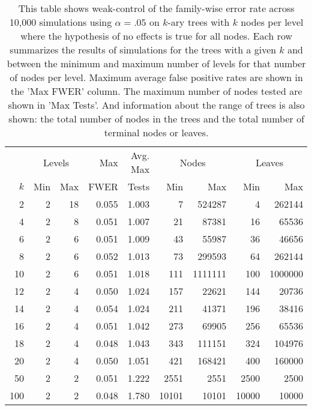 \begin{table}[ht]
\centering
\begin{tabular}{rrrrrrrrr}
  \toprule
  &\multicolumn{2}{c}{Levels} &Max&Avg. Max& \multicolumn{2}{c}{Nodes} & \multicolumn{2}{c}{Leaves}\\ $k$ & Min & Max & FWER & Tests & Min & Max & Min & Max \\ \midrule
   2 &    2 &   18 & 0.055 & 1.003 &    7 & 524287 &    4 & 262144 \\ 
     4 &    2 &    8 & 0.051 & 1.007 &   21 & 87381 &   16 & 65536 \\ 
     6 &    2 &    6 & 0.051 & 1.009 &   43 & 55987 &   36 & 46656 \\ 
     8 &    2 &    6 & 0.052 & 1.013 &   73 & 299593 &   64 & 262144 \\ 
    10 &    2 &    6 & 0.051 & 1.018 &  111 & 1111111 &  100 & 1000000 \\ 
    12 &    2 &    4 & 0.050 & 1.024 &  157 & 22621 &  144 & 20736 \\ 
    14 &    2 &    4 & 0.054 & 1.024 &  211 & 41371 &  196 & 38416 \\ 
    16 &    2 &    4 & 0.051 & 1.042 &  273 & 69905 &  256 & 65536 \\ 
    18 &    2 &    4 & 0.048 & 1.043 &  343 & 111151 &  324 & 104976 \\ 
    20 &    2 &    4 & 0.050 & 1.051 &  421 & 168421 &  400 & 160000 \\ 
    50 &    2 &    2 & 0.051 & 1.222 & 2551 & 2551 & 2500 & 2500 \\ 
   100 &    2 &    2 & 0.048 & 1.780 & 10101 & 10101 & 10000 & 10000 \\ 
   \bottomrule
\end{tabular}
\caption{This table shows weak-control of the
  family-wise error rate across 10,000 simulations using $\alpha=.05$ on
  $k$-ary trees with $k$ nodes per level where the hypothesis of no effects is
  true for all nodes. Each row summarizes the results of simulations for the
  trees with a given $k$ and between the minimum and maximum number of levels
  for that number of nodes per level. Maximum average false positive rates are
  shown in the 'Max FWER' column. The maximum number of nodes tested are shown
  in 'Max Tests'. And information about the range of trees is also shown: the
  total number of nodes in the trees and the total number of terminal nodes or
  leaves.} 
\label{tab:weak_control_sim}
\end{table}
